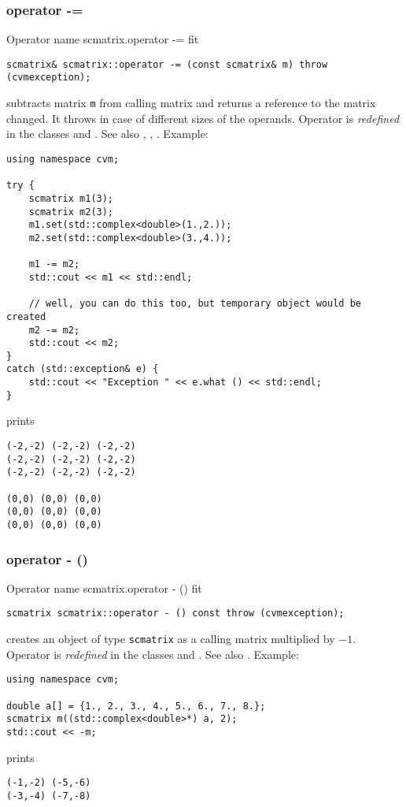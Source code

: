 \subsubsection{operator -=}
Operator%
\pdfdest name {scmatrix.operator -=} fit
\begin{verbatim}
scmatrix& scmatrix::operator -= (const scmatrix& m) throw (cvmexception);
\end{verbatim}
subtracts  matrix \verb"m" from  calling matrix
and returns a reference to
the matrix changed.
It throws  
in case of different sizes of the operands.
Operator is \emph{redefined} in the classes
and .
See also ,
,
.
Example:
\begin{Verbatim}
using namespace cvm;

try {
    scmatrix m1(3);
    scmatrix m2(3);
    m1.set(std::complex<double>(1.,2.));
    m2.set(std::complex<double>(3.,4.));

    m1 -= m2;
    std::cout << m1 << std::endl;

    // well, you can do this too, but temporary object would be created
    m2 -= m2; 
    std::cout << m2;
}
catch (std::exception& e) {
    std::cout << "Exception " << e.what () << std::endl;
}
\end{Verbatim}
prints
\begin{Verbatim}
(-2,-2) (-2,-2) (-2,-2)
(-2,-2) (-2,-2) (-2,-2)
(-2,-2) (-2,-2) (-2,-2)

(0,0) (0,0) (0,0)
(0,0) (0,0) (0,0)
(0,0) (0,0) (0,0)
\end{Verbatim}
\newpage




\subsubsection{operator - ()}
Operator%
\pdfdest name {scmatrix.operator - ()} fit
\begin{verbatim}
scmatrix scmatrix::operator - () const throw (cvmexception);
\end{verbatim}
creates an object of type \verb"scmatrix" as
a calling matrix multiplied by $-1$.
Operator is \emph{redefined} in the classes
and .
See also .
Example:
\begin{Verbatim}
using namespace cvm;

double a[] = {1., 2., 3., 4., 5., 6., 7., 8.};
scmatrix m((std::complex<double>*) a, 2);
std::cout << -m;
\end{Verbatim}
prints
\begin{Verbatim}
(-1,-2) (-5,-6)
(-3,-4) (-7,-8)
\end{Verbatim}
\newpage



